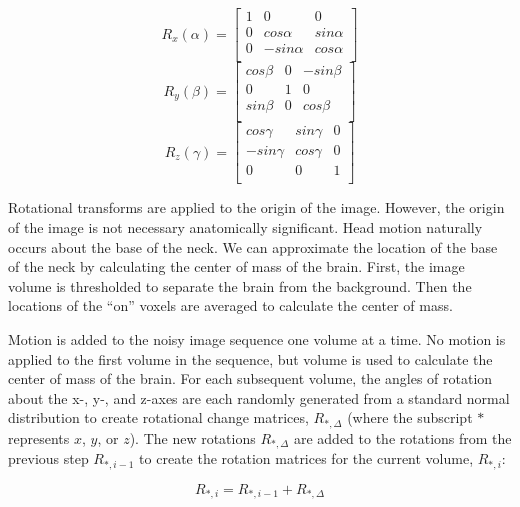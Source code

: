 \begin{equation}
R_x(\alpha) = \begin{bmatrix}
 1 &  0          & 0     \\ 
 0 &  cos\alpha  & sin\alpha \\ 
 0 &  -sin\alpha & cos\alpha \\ 
\end{bmatrix}
\end{equation}
\begin{equation}
R_y(\beta) = \begin{bmatrix}
 cos\beta &  0 & -sin\beta \\ 
 0        &  1 & 0         \\ 
 sin\beta &  0 & cos\beta  \\ 
\end{bmatrix}
\end{equation}
\begin{equation}
R_z(\gamma) = \begin{bmatrix}
 cos\gamma  & sin\gamma  & 0 \\ 
 -sin\gamma & cos\gamma  & 0 \\ 
 0          & 0          & 1 \\ 
\end{bmatrix}
\end{equation}

Rotational transforms are applied to the origin of the image. However, the origin of the image is not necessary anatomically significant. Head motion naturally occurs about the base of the neck. We can approximate the location of the base of the neck by calculating the center of mass of the brain. First, the image volume is thresholded to separate the brain from the background. Then the locations of the ``on'' voxels are averaged to calculate the center of mass. 

Motion is added to the noisy image sequence one volume at a time. No motion is applied to the first volume in the sequence, but volume is used to calculate the center of mass of the brain. For each subsequent volume, the angles of rotation about the x-, y-, and z-axes are each randomly generated from a standard normal distribution to create rotational change matrices, $R_{*,\Delta}$ (where the subscript $*$ represents $x$, $y$, or $z$). The new rotations $R_{*,\Delta}$ are added to the rotations from the previous step $R_{*,i-1}$ to create the rotation matrices for the current volume, $R_{*,i}$:

\begin{equation}
R_{*,i} = R_{*,i-1} + R_{*,\Delta}
\end{equation}

